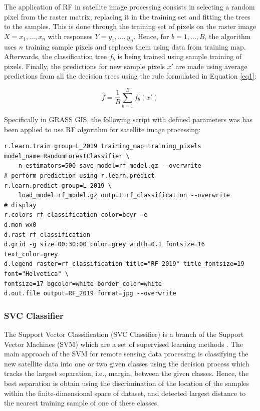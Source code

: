 \documentclass{elektr}
\begin{document}
The application of RF in satellite image processing consists in selecting a random pixel from the raster matrix, replacing it in the training set and fitting the trees to the samples. This is done through the training set of pixels on the raster image $X = x_{1},\dots, x_{n}$ with responses $Y = y_{1}, \dots, y_{n}$. Hence, for $b = 1, \dots, B$, the algorithm uses $n$ training sample pixels and replaces them using data from training map. Afterwards, the classification tree $f_b$ is being trained using sample training of pixels. Finally, the predictions for new sample pixels $x'$ are made using average predictions from all the decision trees using the rule formulated in Equation \ref{eq1}: 

\begin{equation}
\hat f=\frac{1}{B}\sum_{b=1}^{B}f_{b}(x')
\label{eq1}
\end{equation}

Specifically in GRASS GIS, the following script with defined parameters was has been applied to use RF algorithm for satellite image processing: 

\begin{footnotesize}
\begin{verbatim}
r.learn.train group=L_2019 training_map=training_pixels model_name=RandomForestClassifier \
    n_estimators=500 save_model=rf_model.gz --overwrite
# perform prediction using r.learn.predict
r.learn.predict group=L_2019 \
	load_model=rf_model.gz output=rf_classification --overwrite
# display
r.colors rf_classification color=bcyr -e
d.mon wx0
d.rast rf_classification
d.grid -g size=00:30:00 color=grey width=0.1 fontsize=16 text_color=grey
d.legend raster=rf_classification title="RF 2019" title_fontsize=19 font="Helvetica" \
fontsize=17 bgcolor=white border_color=white
d.out.file output=RF_2019 format=jpg --overwrite
\end{verbatim}
\end{footnotesize}

\subsubsection{SVC Classifier}

The Support Vector Classification (SVC Classifier) is a branch of the Support Vector Machines (SVM) which are a set of supervised learning methods \cite{Cortes}. The main approach of the SVM for remote sensing data processing is classifying the new satellite data into one or two given classes using the decision process which tracks the largest separation, i.e., margin, between the given classes. Hence, the best separation is obtain using the discrimination of the location of the samples within the finite-dimensional space of dataset, and detected largest distance to the nearest training sample of one of these classes. 
\end{document}
